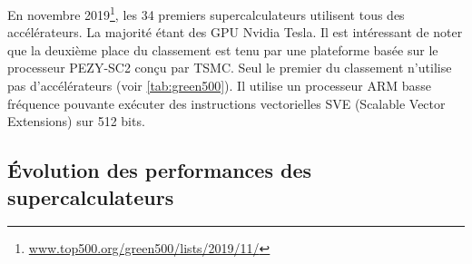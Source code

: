         En novembre 2019\footnote{\url{www.top500.org/green500/lists/2019/11/}}, les 34 premiers supercalculateurs utilisent tous des accélérateurs. La majorité étant des GPU Nvidia Tesla. Il est intéressant de noter que la deuxième place du classement est tenu par une plateforme basée sur le processeur PEZY-SC2 conçu par TSMC. Seul le premier du classement n'utilise pas d'accélérateurs (voir \autoref{tab:green500}). Il utilise un processeur ARM basse fréquence pouvante exécuter des instructions vectorielles SVE (Scalable Vector Extensions) sur 512 bits.
        
        \begin{table}[]
\centering
{}
\caption{Classement du Green500 de novembre 2019 selon l'efficacité énergétique (en GFlops/Watts). Les puissances Rpeak (puissance théorique) et Rmax (puissance mesurée par HPL) sont données en PFlops ($10^{15}$ flops).}
\label{tab:green500}
\end{table}
        
        

        
   
\subsection{Évolution des performances des supercalculateurs}

